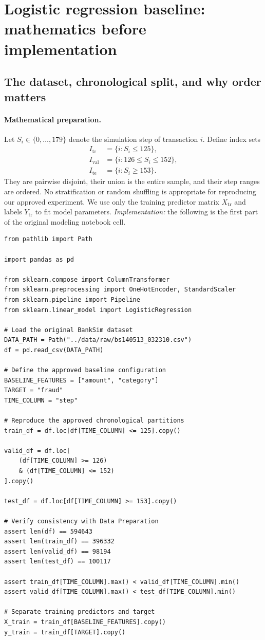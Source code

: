 \documentclass[11pt,a4paper]{article}
\begin{document}
\section{Logistic regression baseline: mathematics before implementation}
\subsection{The dataset, chronological split, and why order matters}
\paragraph{Mathematical preparation.} Let $S_i\in\{0,\ldots,179\}$ denote the simulation step of transaction $i$. Define index sets
\begin{align*}
I_{\mathrm{tr}}&=\{i:S_i\le125\},\\
I_{\mathrm{val}}&=\{i:126\le S_i\le152\},\\
I_{\mathrm{te}}&=\{i:S_i\ge153\}.
\end{align*}
They are pairwise disjoint, their union is the entire sample, and their step ranges are ordered. No stratification or random shuffling is appropriate for reproducing our approved experiment. We use only the training predictor matrix $X_{\mathrm{tr}}$ and labels $Y_{\mathrm{tr}}$ to fit model parameters. \emph{Implementation:} the following is the first part of the original modeling notebook cell.
\begin{lstlisting}
from pathlib import Path

import pandas as pd

from sklearn.compose import ColumnTransformer
from sklearn.preprocessing import OneHotEncoder, StandardScaler
from sklearn.pipeline import Pipeline
from sklearn.linear_model import LogisticRegression

# Load the original BankSim dataset
DATA_PATH = Path("../data/raw/bs140513_032310.csv")
df = pd.read_csv(DATA_PATH)

# Define the approved baseline configuration
BASELINE_FEATURES = ["amount", "category"]
TARGET = "fraud"
TIME_COLUMN = "step"

# Reproduce the approved chronological partitions
train_df = df.loc[df[TIME_COLUMN] <= 125].copy()

valid_df = df.loc[
    (df[TIME_COLUMN] >= 126)
    & (df[TIME_COLUMN] <= 152)
].copy()

test_df = df.loc[df[TIME_COLUMN] >= 153].copy()

# Verify consistency with Data Preparation
assert len(df) == 594643
assert len(train_df) == 396332
assert len(valid_df) == 98194
assert len(test_df) == 100117

assert train_df[TIME_COLUMN].max() < valid_df[TIME_COLUMN].min()
assert valid_df[TIME_COLUMN].max() < test_df[TIME_COLUMN].min()

# Separate training predictors and target
X_train = train_df[BASELINE_FEATURES].copy()
y_train = train_df[TARGET].copy()
\end{lstlisting}
\end{document}
